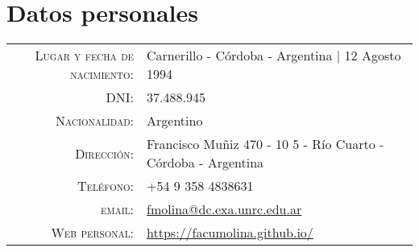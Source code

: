 \documentclass[a4paper,10pt]{article} %
\begin{document}
\pagestyle{empty} %


\par{\bigskip\par} %

\section{Datos personales}

\begin{tabular}{rl}
\\
\textsc{Lugar y fecha de nacimiento:} & Carnerillo - Córdoba - Argentina | 12 Agosto 1994 \\
\textsc{DNI:} & 37.488.945 \\
\textsc{Nacionalidad:} & Argentino \\
\textsc{Dirección:} & Francisco Muñiz 470 - 10 5 - Río Cuarto - Córdoba - Argentina\\
\textsc{Teléfono:} & +54 9 358 4838631\\
\textsc{email:} & \href{mailto:fmolina@dc.exa.unrc.edu.ar}{fmolina@dc.exa.unrc.edu.ar} \\
\textsc{Web personal:} & \href{https://facumolina.github.io/}{https://facumolina.github.io/} 
\end{tabular}

\end{document}
